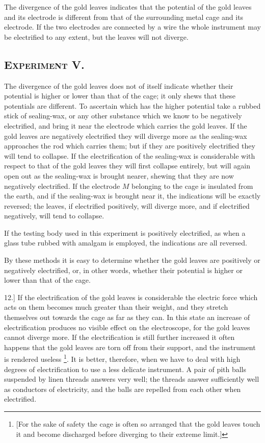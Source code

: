 \documentclass[12pt,oneside]{book}[2021/10/04]
\let\oldfootnote\footnote
\renewcommand\footnote[1]{%
\oldfootnote{\hspace{0.14em}#1}}
\newcommand{\Heading}{\centering\normalfont}
\newcommand{\Section}[1]{\subsection*{\normalsize\Heading\scshape #1}}
\newcommand{\article}[1]{\phantomsection \label{art:#1}{#1.]}}
\newcommand{\¬}{\hphantom{0}}
\begin{document}
The divergence of the gold leaves indicates that the potential of
the gold leaves and its electrode is different from that of the surrounding
metal cage and its electrode. If the two electrodes are
connected by a wire the whole instrument may be electrified to any
extent, but the leaves will not diverge.

\Section{Experiment V.}

The divergence of the gold leaves does not of itself indicate
whether their potential is higher or lower than that of the cage;
it only shews that these potentials are different. To ascertain
which has the higher potential take a rubbed stick of sealing-wax,
or any other substance which we know to be negatively electrified,
and bring it near the electrode which carries the gold leaves. If
the gold leaves are negatively electrified they will diverge more as
the sealing-wax approaches the rod which carries them; but if they
are positively electrified they will tend to collapse. If the electrification
of the sealing-wax is considerable with respect to that of
the gold leaves they will first collapse entirely, but will again
open out as the sealing-wax is brought nearer, shewing that they
are now negatively electrified. If the electrode \(M\) belonging to
the cage is insulated from the earth, and if the sealing-wax is
brought near it, the indications will be exactly reversed; the leaves,
if electrified positively, will diverge more, and if electrified negatively,
will tend to collapse.

If the testing body used in this experiment is positively electrified,
as when a glass tube rubbed with amalgam is employed, the
indications are all reversed.

By these methods it is easy to determine whether the gold leaves
are positively or negatively electrified, or, in other words, whether
their potential is higher or lower than that of the cage.

\article{12} If the electrification of the gold leaves is considerable the
electric force which acts on them becomes much greater than their
weight, and they stretch themselves out towards the cage as far as
they can. In this state an increase of electrification produces no
visible effect on the electroscope, for the gold leaves cannot diverge
more. If the electrification is still further increased it often happens
that the gold leaves are torn off from their support, and the instrument
is rendered useless\footnote{
[For the sake of safety the cage is often so arranged that the gold leaves touch
it and become discharged before diverging to their extreme limit.]
}. It is better, therefore, when we have to
deal with high degrees of electrification to use a less delicate instrument.
A pair of pith balls suspended by linen threads answers
very well; the threads answer sufficiently well as conductors of electricity,
and the balls are repelled from each other when electrified.
\end{document}
